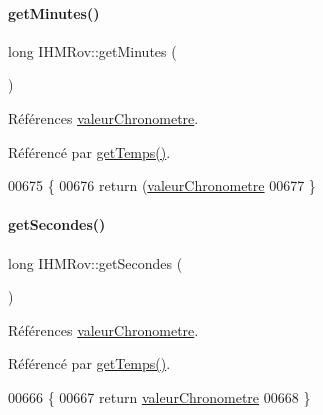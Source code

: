 \paragraph{\texorpdfstring{get\+Minutes()}{getMinutes()}}
{\footnotesize\ttfamily long I\+H\+M\+Rov\+::get\+Minutes (\begin{DoxyParamCaption}{ }\end{DoxyParamCaption})\hspace{0.3cm}{\ttfamily [private]}}



Références \hyperlink{class_i_h_m_rov_a38ad5c20c2347825c237e9b85bb5c7e6}{valeur\+Chronometre}.



Référencé par \hyperlink{class_i_h_m_rov_aa6a269f311d527387ad3c9e22dd12d43}{get\+Temps()}.


\begin{DoxyCode}
00675 \{
00676     \textcolor{keywordflow}{return} (\hyperlink{class_i_h_m_rov_a38ad5c20c2347825c237e9b85bb5c7e6}{valeurChronometre}%
00677 \}
\end{DoxyCode}
\mbox{\label{class_i_h_m_rov_ad28dd7ea40587335f6554de60c828524}} 
\paragraph{\texorpdfstring{get\+Secondes()}{getSecondes()}}
{\footnotesize\ttfamily long I\+H\+M\+Rov\+::get\+Secondes (\begin{DoxyParamCaption}{ }\end{DoxyParamCaption})\hspace{0.3cm}{\ttfamily [private]}}



Références \hyperlink{class_i_h_m_rov_a38ad5c20c2347825c237e9b85bb5c7e6}{valeur\+Chronometre}.



Référencé par \hyperlink{class_i_h_m_rov_aa6a269f311d527387ad3c9e22dd12d43}{get\+Temps()}.


\begin{DoxyCode}
00666 \{
00667     \textcolor{keywordflow}{return} \hyperlink{class_i_h_m_rov_a38ad5c20c2347825c237e9b85bb5c7e6}{valeurChronometre}%
00668 \}
\end{DoxyCode}
\mbox{\label{class_i_h_m_rov_aa6a269f311d527387ad3c9e22dd12d43}} 
